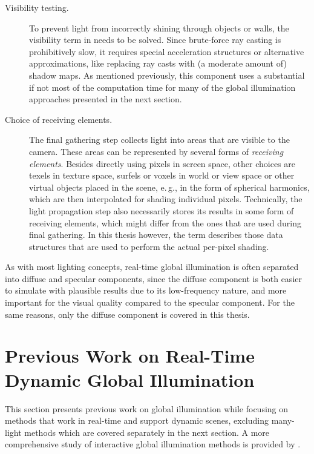 \begin{description}
    \item[Visibility testing.] To prevent light from incorrectly shining through objects or walls, the visibility term in  needs to be solved. Since brute-force ray casting is prohibitively slow, it requires special acceleration structures or alternative approximations, like replacing ray casts with (a moderate amount of) shadow maps. As mentioned previously, this component uses a substantial if not most of the computation time for many of the global illumination approaches presented in the next section.
    \item[Choice of receiving elements.]
    The final gathering step collects light into areas that are visible to the camera. These areas can be represented by several forms of \textit{receiving elements}. Besides directly using pixels in screen space, other choices are texels in texture space, surfels or voxels in world or view space or other virtual objects placed in the scene, e.\,g., in the form of spherical harmonics, which are then interpolated for shading individual pixels. Technically, the light propagation step also necessarily stores its results in some form of receiving elements, which might differ from the ones that are used during final gathering. In this thesis however, the term describes those data structures that are used to perform the actual per-pixel shading.
\end{description}%
%
As with most lighting concepts, real-time global illumination is often separated into diffuse and specular components, since the diffuse component is both easier to simulate with plausible results due to its low-frequency nature, and more important for the visual quality compared to the specular component. For the same reasons, only the diffuse component is covered in this thesis.



\section{Previous Work on Real-Time Dynamic Global Illumination}
\label{sec:intro:gi:previousWork}

This section presents previous work on global illumination while focusing on methods that work in real-time and support dynamic scenes, excluding many-light methods which are covered separately in the next section. A more comprehensive study of interactive global illumination methods is provided by \citet{Ritschel:2012:GISTAR}.

